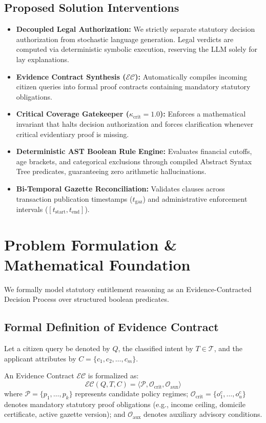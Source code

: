 \documentclass[conference]{IEEEtran}
\begin{document}
\subsection{Proposed Solution Interventions}
\begin{itemize}
    \item \textbf{Decoupled Legal Authorization:} We strictly separate statutory decision authorization from stochastic language generation. Legal verdicts are computed via deterministic symbolic execution, reserving the LLM solely for lay explanations.
    \item \textbf{Evidence Contract Synthesis ($\mathcal{EC}$):} Automatically compiles incoming citizen queries into formal proof contracts containing mandatory statutory obligations.
    \item \textbf{Critical Coverage Gatekeeper ($\kappa_{\text{crit}} = 1.0$):} Enforces a mathematical invariant that halts decision authorization and forces clarification whenever critical evidentiary proof is missing.
    \item \textbf{Deterministic AST Boolean Rule Engine:} Evaluates financial cutoffs, age brackets, and categorical exclusions through compiled Abstract Syntax Tree predicates, guaranteeing zero arithmetic hallucinations.
    \item \textbf{Bi-Temporal Gazette Reconciliation:} Validates clauses across transaction publication timestamps ($t_{\text{gaz}}$) and administrative enforcement intervals ($[t_{\text{start}}, t_{\text{end}}]$).
\end{itemize}

\section{Problem Formulation \& Mathematical Foundation}
We formally model statutory entitlement reasoning as an Evidence-Contracted Decision Process over structured boolean predicates.

\subsection{Formal Definition of Evidence Contract}
Let a citizen query be denoted by $Q$, the classified intent by $T \in \mathcal{T}$, and the applicant attributes by $C = \{c_1, c_2, \dots, c_m\}$.

An Evidence Contract $\mathcal{EC}$ is formalized as:
\begin{equation}
\mathcal{EC}(Q, T, C) = \langle \mathcal{P}, \mathcal{O}_{\text{crit}}, \mathcal{O}_{\text{aux}} \rangle
\end{equation}
where $\mathcal{P} = \{p_1, \dots, p_k\}$ represents candidate policy regimes; $\mathcal{O}_{\text{crit}} = \{o_1^c, \dots, o_u^c\}$ denotes mandatory statutory proof obligations (e.g., income ceiling, domicile certificate, active gazette version); and $\mathcal{O}_{\text{aux}}$ denotes auxiliary advisory conditions.
\end{document}
